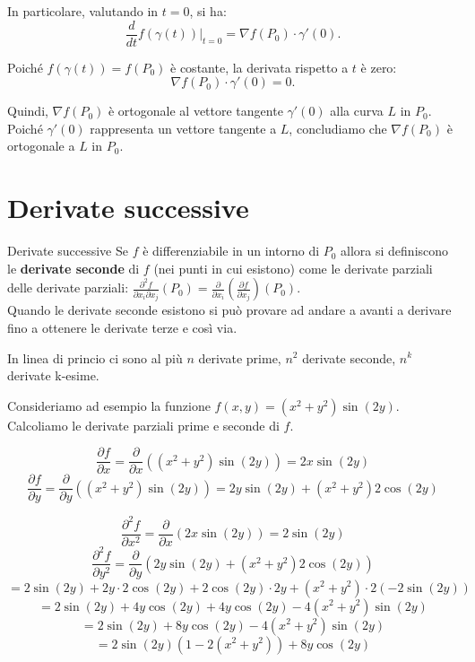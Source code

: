 In particolare, valutando in $t = 0$, si ha:
\[
\frac{d}{dt} f(\gamma(t)) \big|_{t=0} = \nabla f(P_0) \cdot \gamma'(0).
\]

Poiché $f(\gamma(t)) = f(P_0)$ è costante, la derivata rispetto a $t$ è zero:
\[
\nabla f(P_0) \cdot \gamma'(0) = 0.
\]

Quindi, $\nabla f(P_0)$ è ortogonale al vettore tangente $\gamma'(0)$ alla curva $L$ in $P_0$. Poiché $\gamma'(0)$ rappresenta un vettore tangente a $L$, concludiamo che $\nabla f(P_0)$ è ortogonale a $L$ in $P_0$.



\section{Derivate successive}
\begin{definizione}{Derivate successive}
  Se $f$ è differenziabile in un intorno di $P_0$ allora si definiscono le \textbf{derivate seconde} di $f$ (nei punti in cui esistono) come le derivate parziali delle derivate parziali: $\frac{\partial^2 f}{\partial x_i \partial x_j}(P_0) = \frac{\partial}{\partial x_i} \left(\frac{\partial f}{\partial x_j}\right)(P_0)$.  \\
  Quando le derivate seconde esistono si può provare ad andare a avanti a derivare fino a ottenere le derivate terze e così via.
\end{definizione}
\begin{osservazione}{}
  In linea di princio ci sono al più $n$ derivate prime, $n^2$ derivate seconde, $n^k$ derivate k-esime.
\end{osservazione}

Consideriamo ad esempio la funzione $f(x,y) = (x^2 + y^2)\sin(2y)$. Calcoliamo le derivate parziali prime e seconde di $f$.


\[
\frac{\partial f}{\partial x} = \frac{\partial}{\partial x} \left( (x^2 + y^2)\sin(2y) \right) = 2x\sin(2y)
\]
\[
\frac{\partial f}{\partial y} = \frac{\partial}{\partial y} \left( (x^2 + y^2)\sin(2y) \right) = 2y\sin(2y) + (x^2 + y^2)2\cos(2y)
\]

\[
\frac{\partial^2 f}{\partial x^2} = \frac{\partial}{\partial x} \left( 2x\sin(2y) \right) = 2\sin(2y)
\]
\[
\frac{\partial^2 f}{\partial y^2} = \frac{\partial}{\partial y} \left( 2y\sin(2y) + (x^2 + y^2)2\cos(2y) \right)
\]
\[
= 2\sin(2y) + 2y \cdot 2\cos(2y) + 2\cos(2y) \cdot 2y + (x^2 + y^2) \cdot 2(-2\sin(2y))
\]
\[
= 2\sin(2y) + 4y\cos(2y) + 4y\cos(2y) - 4(x^2 + y^2)\sin(2y)
\]
\[
= 2\sin(2y) + 8y\cos(2y) - 4(x^2 + y^2)\sin(2y)
\]
\[
= 2\sin(2y)(1 - 2(x^2 + y^2)) + 8y\cos(2y)
\]

